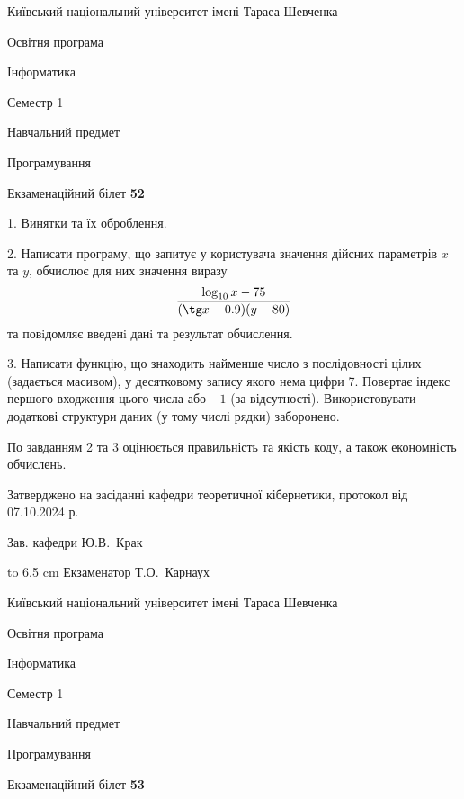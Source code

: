 \documentclass[12pt, ukrainian]{article}
\begin{document}
\newpage
{{\begin {scriptsize}\par
{ \center  Київський національний університет імені Тараса Шевченка \par}
{\parbox {5 cm}{Освітня програма \hfill}{\parbox {7 cm}{Інформатика\hfill}}\parbox {6 cm}{\hfill Семестр 1}}\par
{\parbox {5 cm} {Навчальний предмет \hfill}\parbox {7 cm}{Програмування \hfill}\parbox {6cm}{\hfill}\par}\vspace{-15pt} \end{scriptsize}}{\center Екзаменаційний білет \No \textbf { 52 }\par}}
{%
1. Винятки та їх оброблення.%
\par
2. Написати програму, що запитує у користувача значення дійсних параметрів $x$ та $y$, обчислює для них значення виразу 
$$\frac{\log_{10} x - 75}{(\tg x - 0.9) (y - 80)}$$ 
та повiдомляє введенi данi та результат обчислення.

\par
3. Написати функцію, що знаходить найменше число з послідовності цілих (задається масивом), у десятковому запису якого нема цифри 7. Повертає індекс першого входження цього числа або $-1$ (за відсутності). Використовувати додаткові структури даних (у тому числі рядки) заборонено.

По завданням 2 та 3 оцінюється правильність та якість коду, а також економність обчислень.

}
{\smallskip\smallskip \begin {scriptsize} Затверджено на засіданні кафедри теоретичної кібернетики, протокол   від   07.10.2024 р.\par\smallskip\smallskip\smallskip\smallskip
{\parbox {6.5 cm} {Зав. кафедри \dotfill Ю.В.~Крак}}\hspace {0.7cm} {\hbox to 6.5 cm { Екзаменатор \dotfill Т.О.~Карнаух}} \end{scriptsize}}
\vspace{0.9cm}
{{\begin {scriptsize}\par
{ \center  Київський національний університет імені Тараса Шевченка \par}
{\parbox {5 cm}{Освітня програма \hfill}{\parbox {7 cm}{Інформатика\hfill}}\parbox {6 cm}{\hfill Семестр 1}}\par
{\parbox {5 cm} {Навчальний предмет \hfill}\parbox {7 cm}{Програмування \hfill}\parbox {6cm}{\hfill}\par}\vspace{-15pt} \end{scriptsize}}{\center Екзаменаційний білет \No \textbf { 53 }\par}}
\end{document}
